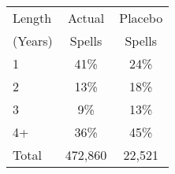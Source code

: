 \begin{tabular}{lcc}
\toprule
Length & Actual & Placebo \\
(Years) & Spells & Spells \\
\midrule
1 & 41\% & 24\% \\
2 & 13\% & 18\% \\
3 & 9\% & 13\% \\
4+ & 36\% & 45\% \\
Total &      472,860 &       22,521 \\
\bottomrule
\end{tabular}
